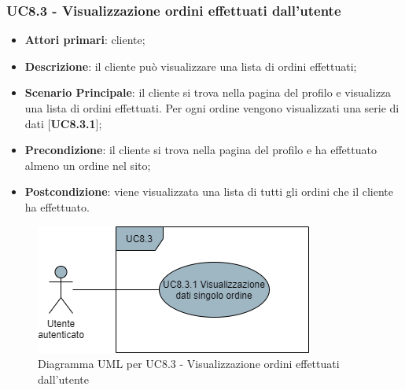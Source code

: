 \subsubsection{UC8.3 - Visualizzazione ordini effettuati dall'utente}
\begin{itemize}
\item \textbf{Attori primari}: cliente;
\item \textbf{Descrizione}: il cliente può visualizzare una lista di ordini effettuati;
\item \textbf{Scenario Principale}: il cliente si trova nella pagina del profilo e visualizza una lista di ordini effettuati. Per ogni ordine vengono visualizzati una serie di dati [\textbf{UC8.3.1}];
\item \textbf{Precondizione}: il cliente si trova nella pagina del profilo e ha effettuato almeno un ordine nel sito;
\item \textbf{Postcondizione}: viene visualizzata una lista di tutti gli ordini che il cliente ha effettuato.
\end{itemize}

\begin{figure}[H]
\centering
\includegraphics[scale=0.6]{res/UseCase/Immagini/VisualizzazioneOrdini}
\caption{Diagramma UML per UC8.3 - Visualizzazione ordini effettuati dall'utente}
\end{figure}

